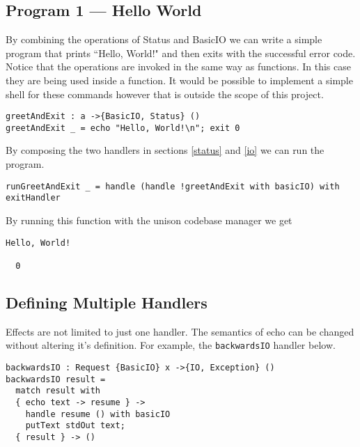 \documentclass[logo,bsc,singlespacing,parskip]{infthesis}
\begin{document}
\begin{tcolorbox}[colback=gray!10, colframe=black, arc=0pt, outer arc=0pt]

\section*{Program 1 --- Hello World}

By combining the operations of Status and BasicIO we can write a simple program that prints ``Hello, World!" and then exits with the successful error code. Notice that the operations are invoked in the same way as functions. In this case they are being used inside a function. It would be possible to implement a simple shell for these commands however that is outside the scope of this project.

\begin{lstlisting}[language=unison]
greetAndExit : a ->{BasicIO, Status} ()
greetAndExit _ = echo "Hello, World!\n"; exit 0
\end{lstlisting}

By composing the two handlers in sections \ref{status} and \ref{io} we can run the program.

\begin{lstlisting}[language=unison]
runGreetAndExit _ = handle (handle !greetAndExit with basicIO) with exitHandler
\end{lstlisting}

By running this function with the unison codebase manager we get

\begin{lstlisting}[style=terminal]
Hello, World!

  0
\end{lstlisting}
\end{tcolorbox}

\subsection{Defining Multiple Handlers}

Effects are not limited to just one handler. The semantics of echo can be
changed without altering it's definition. For example, the \texttt{backwardsIO}
handler below.

\begin{lstlisting}[language=unison]
backwardsIO : Request {BasicIO} x ->{IO, Exception} () 
backwardsIO result =
  match result with
  { echo text -> resume } -> 
    handle resume () with basicIO 
    putText stdOut text;
  { result } -> ()
\end{lstlisting}
\end{document}
